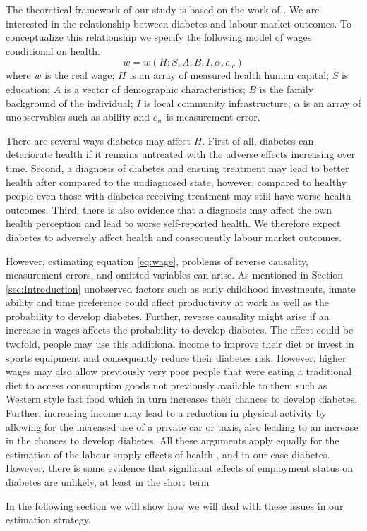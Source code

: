 The theoretical framework of our study is based on the work of \citet{Strauss1998}. We are interested in the relationship between diabetes and labour market outcomes. To conceptualize this relationship we specify the following model of wages conditional on health.
\begin{equation}
w=w(H;S,A,B,I,\alpha,e_{w})\label{eq:wage}
\end{equation}
where $w$ is the real wage; $H$ is an array of measured health human capital; $S$ is education; $A$ is a vector of demographic characteristics; $B$ is the family background of the individual; $I$ is local community infrastructure; $\alpha$ is an array of unobservables such as ability and $e_w$ is measurement error. 

There are several ways diabetes may affect $H$. First of all, diabetes can deteriorate health if it remains untreated with the adverse effects increasing over time. Second, a diagnosis of diabetes and ensuing treatment may lead to better health after compared to the undiagnosed state, however, compared to healthy people even those with diabetes receiving treatment may still have worse health outcomes. Third, there is also evidence that a diagnosis may affect the own health perception and lead to worse self-reported health. We therefore expect diabetes to adversely affect health and consequently labour market outcomes.

However, estimating equation  \ref{eq:wage}, problems of reverse causality, measurement errors, and omitted variables can arise. As mentioned in Section  \ref{sec:Introduction} unobserved factors such as early childhood investments, innate ability and time preference could affect productivity at work as well as the probability to develop diabetes. Further, reverse causality might arise if an increase in wages affects the probability to develop diabetes. The effect could be twofold, people may use this additional income to improve their diet or invest in sports equipment and consequently reduce their diabetes risk. However, higher wages may also allow previously very poor people that were eating a traditional diet to access consumption goods not previously available to them such as Western style fast food which in turn increases their chances to develop diabetes. Further, increasing income may lead to a reduction in physical activity by allowing for the increased use of a private car or taxis, also leading to an increase in the chances to develop diabetes. All these arguments apply equally for the estimation of the labour supply effects of health \citep{Strauss2007}, and in our case diabetes. However, there is some evidence that significant effects of employment status on diabetes are unlikely, at least in the short term \citep{Schaller2015} 

  

In the following section we will show how we will deal with these issues in our estimation strategy.